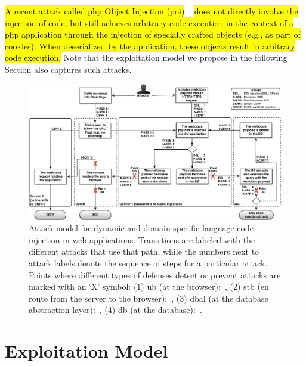 \documentclass[10pt,journal,compsoc]{IEEEtran}
\newcommand{\hlc}[2][yellow]{ {\sethlcolor{#1} \hl{#2}} }
\begin{document}
\hlc[yellow]{A recent attack called {\sc php} Object Injection
({\sc poi})}~\cite{DKH14} \hlc[yellow]{does not directly involve
the injection of code, but still achieves arbitrary code execution
in the context of a {\sc php} application through the
injection of specially crafted objects
(e.g., as part of cookies).
When deserialized
by the application, these objects result in
arbitrary code execution.}
Note that the exploitation model we propose
in the following Section also captures such attacks.

\begin{figure}[t]
\begin{center}
\leavevmode
\includegraphics[scale=0.46]{attacks-steps-CSRF.pdf}
\end{center}
\vspace{-5.5mm}
\caption{\label{fig:attacks}Attack model for dynamic and domain specific
language code injection in web applications.
Transitions are labeled with the different attacks that use that path,
while the numbers next to attack labels denote the 
sequence of steps for a particular attack.
Points where different types of defenses
detect or prevent attacks are marked with an `X' symbol:
(1) {\sc ub} (at the browser):~\cite{KJKV09,LV09,TNH07,NSS06,APKLM10,ML10,YCIS07,
PSC09,VDDPJ11,OWVS08,DDHPJ10,VFJKKV07,SLMS14,BV08,SSM10,HBBS14,SYMRHKM14,BCJPST15,GLSTMMR12},
(2) {\sc s}t{\sc b} (en route from the server to the browser):~\cite{RDWDE07,JKK06a,GC09,JB07,NLC07,WPLKK09,JEP08,PS11},
(3) {\sc dbal} (at the database abstraction layer):~\cite{BWS05,SW06,HCF05,XBS06,PB05,PMP11,MS09,HO05b,SMS13},
(4) {\sc db} (at the database):~\cite{BK04,LLW02,VMV05,CVMA07,GLSTMMR12,CPSPBCCSL12}.}
\vspace{-6mm}
\end{figure}

\section{Exploitation Model}
\label{sec:model}
\end{document}
